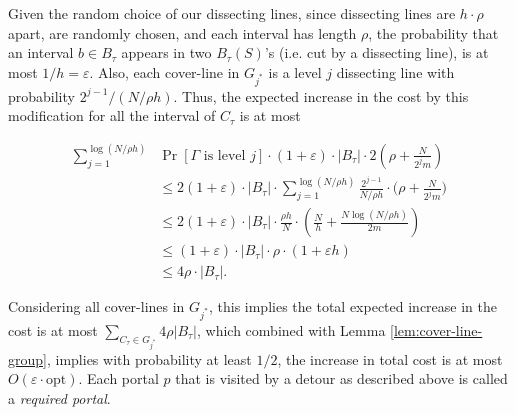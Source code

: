 \documentclass[10pt,a4paper]{amsart}
\theoremstyle{thmstyleone}
\newcommand{\eps}{\varepsilon}
\newcommand{\opt}{{\text{opt}}}
\begin{document}
Given the random choice of our dissecting lines, since dissecting lines are $h\cdot\rho$ apart, are randomly chosen, and each interval has length $\rho$, the probability that an interval $b\in B_\tau$ appears in two $B_\tau(S)$'s (i.e. cut by a dissecting line), is at most $1/{h}=\eps$. Also, each cover-line in $G_{j^*}$ is a level $j$ dissecting line with probability $2^{j-1}/(N/\rho h)$.
Thus, the expected increase in the cost by this modification for all the
interval of $C_\tau$ is at most

\begin{align*}
    \sum_{j=1}^{\log (N/\rho h)}& \Pr[\mbox{$\Gamma$ is level $j$}]\cdot (1+\eps)\cdot|B_\tau|\cdot 2(\rho+\frac{N}{2^jm})\\
    &\le  2(1+\eps)\cdot|B_\tau|\cdot\sum_{j=1}^{\log(N/\rho h)} \frac{2^{j-1}}{N/\rho h}\cdot\left.(\rho+\frac{N}{2^j m}\right.)\\
    &\le  2(1+\eps)\cdot |B_\tau|\cdot \frac{\rho h}{N} \cdot \left(\frac{N}{h}+\frac{N\log(N/\rho h)}{2m}\right)\\
    &\le  (1+\eps)\cdot|B_\tau|\cdot\rho\cdot(1+\eps h)\\
    &\leq 4\rho\cdot|B_\tau|.
\end{align*}


Considering all cover-lines in $G_{j^*}$, this implies the total expected increase
in the cost is at most $\sum_{C_\tau\in G_{j^*}} 4\rho|B_\tau|$, which combined with Lemma 
\ref{lem:cover-line-group}, implies with probability at least $1/2$, the increase in total cost is at most $O(\eps\cdot\opt)$. Each portal $p$ that is visited by a detour as described above is called a {\em required portal}. 
\end{document}
